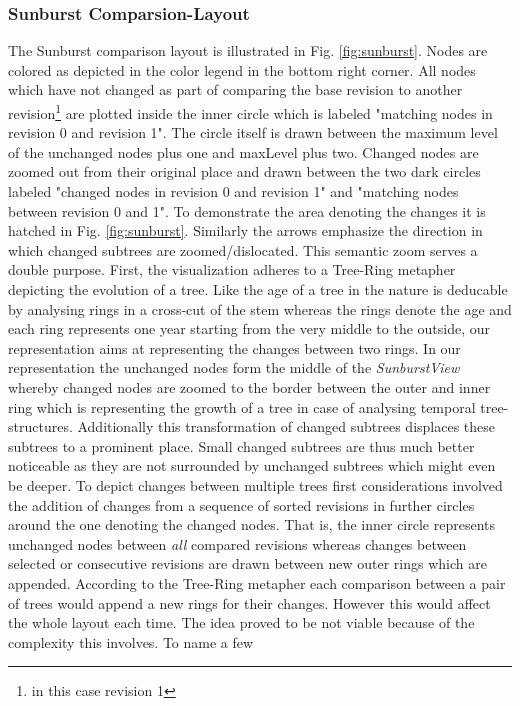 \subsubsection{Sunburst Comparsion-Layout}
The Sunburst comparison layout is illustrated in Fig. \ref{fig:sunburst}. Nodes are colored as depicted in the color legend in the bottom right corner. All nodes which have not changed as part of comparing the base revision to another revision\footnote{in this case revision 1} are plotted inside the inner circle which is labeled "matching nodes in revision 0 and revision 1". The circle itself is drawn between the maximum level of the unchanged nodes plus one and maxLevel plus two. Changed nodes are zoomed out from their original place and drawn between the two dark circles labeled "changed nodes in revision 0 and revision 1" and "matching nodes between revision 0 and 1". To demonstrate the area denoting the changes it is hatched in Fig. \ref{fig:sunburst}. Similarly the arrows emphasize the direction in which changed subtrees are zoomed/dislocated. This semantic zoom serves a double purpose. First, the visualization adheres to a Tree-Ring metapher depicting the evolution of a tree. Like the age of a tree in the nature is deducable by analysing rings in a cross-cut of the stem whereas the rings denote the age and each ring represents one year starting from the very middle to the outside, our representation aims at representing the changes between two rings. In our representation the unchanged nodes form the middle of the \emph{SunburstView} whereby changed nodes are zoomed to the border between the outer and inner ring which is representing the growth of a tree in case of analysing temporal tree-structures. Additionally this transformation of changed subtrees displaces these subtrees to a prominent place. Small changed subtrees are thus much better noticeable as they are not surrounded by unchanged subtrees which might even be deeper. To depict changes between multiple trees first considerations involved the addition of changes from a sequence of sorted revisions in further circles around the one denoting the changed nodes. That is, the inner circle represents unchanged nodes between \emph{all} compared revisions whereas changes between selected or consecutive revisions are drawn between new outer rings which are appended. According to the Tree-Ring metapher each comparison between a pair of trees would append a new rings for their changes. However this would affect the whole layout each time. The idea proved to be not viable because of the complexity this involves. To name a few

